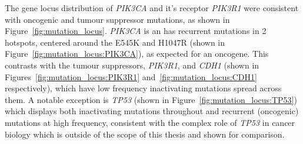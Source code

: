 The gene locus distribution of \textit{PIK3CA} and it's receptor \textit{PIK3R1} were consistent with oncogenic and tumour suppressor mutations, as shown in Figure~\ref{fig:mutation_locus}. \textit{PIK3CA} is an has recurrent mutations in 2 hotspots, centered around the E545K and H1047R (shown in Figure~\ref{fig:mutation_locus:PIK3CA}), as expected for an oncogene. This contrasts with the tumour suppressors, \textit{PIK3R1}, and \textit{CDH1} (shown in Figures~\ref{fig:mutation_locus:PIK3R1} and~\ref{fig:mutation_locus:CDH1} respectively), which have low frequency inactivating mutations spread across them. A notable exception is \textit{TP53} (shown in Figure~\ref{fig:mutation_locus:TP53}) which displays both inactivating mutations throughout and recurrent (oncogenic) mutations at high frequency, consistent with the complex role of \textit{TP53} in cancer biology which is outside of the scope of this thesis and shown for comparison. 


